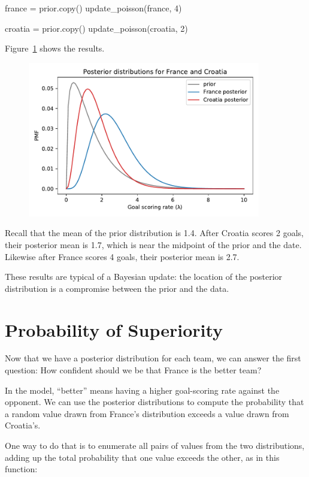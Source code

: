 \documentclass[12pt]{book}
\theoremstyle{exercise}
\begin{document}
\begin{code}
france = prior.copy()
update_poisson(france, 4)

croatia = prior.copy()
update_poisson(croatia, 2)
\end{code}

Figure~\ref{fig07-03} shows the results.

\begin{figure}
\centerline{\includegraphics[width=4in]{figs/fig07-03.pdf}}
\caption{}
\label{fig07-03}
\end{figure}

Recall that the mean of the prior distribution is 1.4.
After Croatia scores 2 goals, their posterior mean is 1.7, which is near the midpoint of the prior and the date.
Likewise after France scores 4 goals, their posterior mean is 2.7.

These results are typical of a Bayesian update: the location of the posterior distribution is a compromise between the prior and the data.


\section{Probability of Superiority}

Now that we have a posterior distribution for each team, we can answer the first question: How confident should we be that France is the better team?

In the model, ``better'' means having a higher goal-scoring rate against the opponent.
We can use the posterior distributions to compute the probability that a random value drawn from France's distribution exceeds a value drawn from Croatia's.

One way to do that is to enumerate all pairs of values from the two distributions, adding up the total probability that one value exceeds the other, as in this function:
\end{document}
